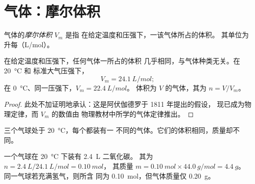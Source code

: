 \section{气体：摩尔体积}

\begin{definition}[摩尔体积]\label{def:g10:the-mole:molar-volume}
气体的\emph{摩尔体积} $V_m$ 是指
在给定温度和压强下，一该气体所占的体积。
其单位为升每（\si{L/mol}）。
\end{definition}

\begin{proposition}[所有气体的摩尔体积相同]\label{prop:g10:the-mole:avogadro-law}
在给定温度和压强下，任何气体一所占的体积
几乎相同，与气体种类无关。在 \qty{20}{\celsius} 和
标准大气压强下，
\[
  V_m = \qty{24.1}{L/mol};
\]
在 \qty{0}{\celsius}、同一压强下，$V_m = \qty{22.4}{L/mol}$。
体积为 $V$ 的气体，其为 $n = V / V_m$。
\end{proposition}

\begin{proof}
此处不加证明地承认：这是阿伏伽德罗于 1811 年提出的假设，
现已成为物理定律，而 $V_m$ 的数值由
物理教材中所学的气体定律推出。
\end{proof}

\begin{omfigure}

{\small 三个气球处于 \qty{20}{\celsius}，每个都装有一
不同的气体。它们的体积相同，质量却不同。}
\end{omfigure}


\begin{example}[一个装有二氧化碳的气球]\label{ex:g10:the-mole:balloon}
一个气球在 \qty{20}{\celsius} 下装有 \qty{2.4}{L} 二氧化碳。
其为 $n = \qty{2.4}{L} / \qty{24.1}{L/mol} = \qty{0.10}{mol}$，
其质量 $m = \qty{0.10}{mol} \times \qty{44.0}{g/mol} =
\qty{4.4}{g}$。同一气球若充满氢气，则所含
同为 \qty{0.10}{mol}，但气体质量仅 \qty{0.20}{g}。
\end{example}

